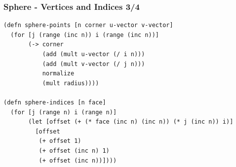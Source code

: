 \documentclass[aspectratio=169,11pt,xcolor=dvipsnames]{beamer}
\begin{document}
\begin{frame}[fragile]
  \frametitle{Sphere {-} Vertices and Indices 3/4}
  \begin{verbatim}
(defn sphere-points [n corner u-vector v-vector]
  (for [j (range (inc n)) i (range (inc n))]
       (-> corner
           (add (mult u-vector (/ i n)))
           (add (mult v-vector (/ j n)))
           normalize
           (mult radius))))

(defn sphere-indices [n face]
  (for [j (range n) i (range n)]
       (let [offset (+ (* face (inc n) (inc n)) (* j (inc n)) i)]
         [offset
          (+ offset 1)
          (+ offset (inc n) 1)
          (+ offset (inc n))])))
  \end{verbatim}
\end{frame}
\end{document}
